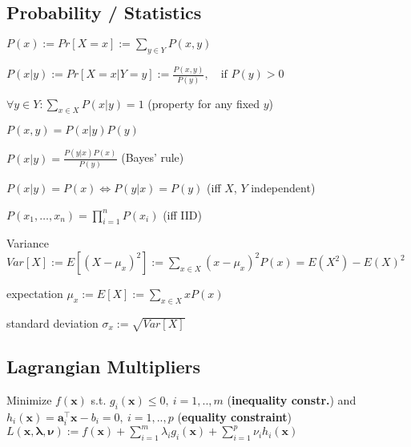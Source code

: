 \subsection*{Probability / Statistics}
\begin{inparaitem}
	\item $P(x) := Pr[X = x] := \sum_{y \in Y} P(x, y)$
	\item $P(x|y) := Pr[X = x | Y = y] := \frac{P(x,y)}{P(y)},\quad \text{if } P(y) > 0$
	\item $\forall y \in Y: \sum_{x \in X} P(x|y) = 1$ (property for any fixed $y$)
	\item $P(x, y) = P(x|y) P(y)$
	\item $P(x|y) = \frac{P(y|x)P(x)}{P(y)}$ (Bayes' rule)
	\item $P(x|y) = P(x) \Leftrightarrow P(y|x) = P(y)$ (iff $X$, $Y$ independent)
	\item $P(x_1, \ldots, x_n) = \prod_{i=1}^n P(x_i)$ (iff IID)
	\item Variance $Var[X]:= E[(X-\mu_x)^2]:=\sum_{x \in X}(x-\mu_x)^2P(x)= E(X^2) - E(X)^2$
	\item expectation $\mu_x := E[X]:=\sum_{x \in X}xP(x)$
	\item standard deviation $\sigma_x := \sqrt{Var[X]}$
\end{inparaitem}


\subsection*{Lagrangian Multipliers}
Minimize  $f(\mathbf{x})$ s.t. $g_i(\mathbf{x}) \leq 0,\ i = 1, .., m$ (\textbf{inequality constr.}) and $h_i(\mathbf{x}) = \mathbf{a}_i^\top \mathbf{x} - b_i = 0,\ i = 1, .., p$ (\textbf{equality constraint}) \\
$L(\mathbf{x}, \boldsymbol{\lambda}, \boldsymbol{\nu}) := f(\mathbf{x}) + \sum_{i=1}^m \lambda_i g_i(\mathbf{x}) + \sum_{i=1}^p \nu_i h_i(\mathbf{x})$
